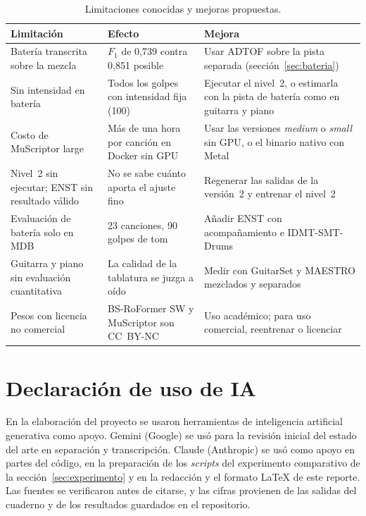 \documentclass[11pt,a4paper]{article}
\begin{document}
\begin{table}[ht]
\centering
\caption{Limitaciones conocidas y mejoras propuestas.}
\label{tab:limites}
\small
\begin{tabularx}{\linewidth}{>{\raggedright\arraybackslash}p{3.6cm}LL}
\toprule
\textbf{Limitación} & \textbf{Efecto} & \textbf{Mejora} \\
\midrule
Batería transcrita sobre la mezcla & $F_1$ de 0{,}739 contra 0{,}851 posible & Usar ADTOF sobre la pista separada (sección~\ref{sec:bateria}) \\
Sin intensidad en batería & Todos los golpes con intensidad fija (100) & Ejecutar el nivel~2, o estimarla con la pista de batería como en guitarra y piano \\
Costo de MuScriptor large & Más de una hora por canción en Docker sin GPU & Usar las versiones \emph{medium} o \emph{small} sin GPU, o el binario nativo con Metal \\
Nivel~2 sin ejecutar; ENST sin resultado válido & No se sabe cuánto aporta el ajuste fino & Regenerar las salidas de la versión~2 y entrenar el nivel~2 \\
Evaluación de batería solo en MDB & 23 canciones, 90 golpes de tom & Añadir ENST con acompañamiento e IDMT-SMT-Drums \\
Guitarra y piano sin evaluación cuantitativa & La calidad de la tablatura se juzga a oído & Medir con GuitarSet y MAESTRO mezclados y separados \\
Pesos con licencia no comercial & BS-RoFormer SW y MuScriptor son CC~BY-NC & Uso académico; para uso comercial, reentrenar o licenciar \\
\bottomrule
\end{tabularx}
\end{table}

\section{Declaración de uso de IA}

En la elaboración del proyecto se usaron herramientas de inteligencia artificial generativa como apoyo.
Gemini (Google) se usó para la revisión inicial del estado del arte en separación y transcripción. Claude
(Anthropic) se usó como apoyo en partes del código, en la preparación de los \emph{scripts} del
experimento comparativo de la sección~\ref{sec:experimento} y en la redacción y el formato \LaTeX{} de este
reporte. Las fuentes se verificaron antes de citarse, y las cifras provienen de las salidas del cuaderno y
de los resultados guardados en el repositorio.
\end{document}
